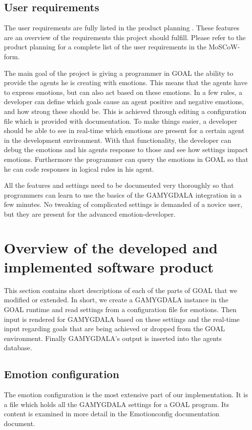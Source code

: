 \documentclass[11pt]{article}
\begin{document}
\subsection{User requirements}
The user requirements are fully listed in the product planning \cite{productplan}. These features are an overview of the requirements this project should fulfill. Please refer to the product planning for a complete list of the user requirements in the \gls{MoSCoW}-form.\cite{MoSCoW}\par
The main goal of the project is giving a programmer in GOAL the ability to provide the agents he is creating with emotions. This means that the agents have to express emotions, but can also act based on these emotions. In a few rules, a developer can define which goals cause an agent positive and negative emotions, and how strong these should be. This is achieved through editing a configuration file which is provided with documentation. To make things easier, a developer should be able to see in real-time which emotions are present for a certain agent in the development environment. With that functionality, the developer can debug the emotions and his agents response to those and see how settings impact emotions. Furthermore the programmer can query the emotions in GOAL so that he can code responses in logical rules in his agent. \par All the features and settings need to be documented very thoroughly so that programmers can learn to use the basics of the GAMYGDALA integration in a few minutes. No tweaking of complicated settings is demanded of a novice user, but they are present for the advanced emotion-developer.


\section{Overview of the developed and implemented software product}
This section contains short descriptions of each of the parts of \gls{GOAL}\cite{GOAL Env} that we modified or extended. In short, we create a \gls{GAMYGDALA} instance in the GOAL runtime and read settings from a configuration file for emotions. Then input is rendered for GAMYGDALA based on these settings and the real-time input regarding goals that are being achieved or dropped from the GOAL environment. Finally GAMYGDALA's output is inserted into the agents database.

\subsection{Emotion configuration}
The emotion configuration\cite{emotionconfig} is the most extensive part of our implementation. It is a file which holds all the GAMYGDALA settings for a GOAL program. Its content is examined in more detail in the Emotionconfig documentation document.
\end{document}
